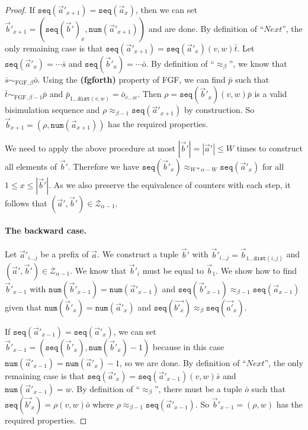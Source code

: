 \documentclass[draft]{scrartcl}
\theoremstyle{definition}
\newcommand{\seq}[1]{\mathtt{seq}({#1})}
\newcommand{\num}[1]{\mathtt{num}({#1})}
\newcommand{\dist}[2]{\mathtt{dist}({#1},{#2})}
\newcommand{\sij}{_{i\ldots{}j}}
\begin{document}
\begin{proof}
  If $\seq{\overrightarrow{a}'_{x+1}} = \seq{\overrightarrow{a}_{x}}$, then we can set $\overrightarrow{b}'_{x+1} = (\seq{\overrightarrow{b}'}_{x}, \num{\overrightarrow{a}'_{x+1}})$ and are done.
  By definition of ``$\mathit{Next}$'', the only remaining case is that $\seq{\overrightarrow{a}'_{x+1}} = \seq{\overrightarrow{a}'_{x}} (v, w) \bar{t}$.
  Let $\seq{\overrightarrow{a}'_{x}} = \cdots{}\bar{s}$ and $\seq{\overrightarrow{b}'_{x}} = \cdots{}\bar{o}$.
  By definition of ``$\approx_{\beta}$'', we know that $\bar{s} \sim_{\mathrm{FGF},\beta} \bar{o}$.
  Using the \textbf{(fgforth)} property of FGF, we can find $\bar{p}$ such that $\bar{t} \sim_{\mathrm{FGF},\beta-1} \bar{p}$ and $\bar{p}_{1\ldots{}\dist{v}{w}} = \bar{o}_{v\ldots{}w}$.
  Then $\rho = \seq{\overrightarrow{b}'_{x}} (v,w) \bar{p}$ is a valid bisimulation sequence and $\rho \approx_{\beta-1} \seq{\overrightarrow{a}'_{x+1}}$ by construction.
  So $\overrightarrow{b}_{x+1} = (\rho, \num{\overrightarrow{a}_{x+1}})$ has the required properties.

  We need to apply the above procedure at most $|\overrightarrow{b}'| = |\overrightarrow{a}'| \le W$ times to construct all elements of $\overrightarrow{b}'$.
  Therefore we have $\seq{\overrightarrow{b}'_{x}} \approx_{W*\alpha-W} \seq{\overrightarrow{a}'_{x}}$ for all $1 \le x \le |\overrightarrow{b}'|$.
  As we also preserve the equivalence of counters with each step, it follows that $(\overrightarrow{a}', \overrightarrow{b}') \in \mathcal{Z}_{\alpha-1}$.

  \paragraph{The backward case.}
  Let $\overrightarrow{a}'\sij$ be a prefix of $\overrightarrow{a}$.
  We construct a tuple $\overrightarrow{b}'$ with $\overrightarrow{b}'\sij = \overrightarrow{b}_{1\ldots{}\dist{i}{j}}$ and $(\overrightarrow{a}', \overrightarrow{b}') \in \mathcal{Z}_{\alpha-1}$.
  We know that $\overrightarrow{b}'_{i}$ must be equal to $\overrightarrow{b}_{1}$.
  We show how to find $\overrightarrow{b}'_{x-1}$ with $\num{\overrightarrow{b}'_{x-1}} = \num{\overrightarrow{a}'_{x-1}}$ and $\seq{\overrightarrow{b}'_{x-1}} \approx_{\beta-1} \seq{\overrightarrow{a}_{x-1}}$ given that $\num{\overrightarrow{b}'_{x}} = \num{\overrightarrow{a}'_{x}}$ and $\seq{\overrightarrow{b'_{x}}} \approx_{\beta} \seq{\overrightarrow{a'}_{x}}$.

  If $\seq{\overrightarrow{a}'_{x-1}} = \seq{\overrightarrow{a}'_{x}}$, we can set $\overrightarrow{b}'_{x-1} = (\seq{\overrightarrow{b}'_{x}}, \num{\overrightarrow{b}'_{x}} - 1)$ because in this case $\num{\overrightarrow{a}'_{x-1}} = \num{\overrightarrow{a}'_{x}} - 1$, so we are done.
  By definition of ``$\mathit{Next}$'', the only remaining case is that $\seq{\overrightarrow{a}'_{x}} = \seq{\overrightarrow{a}'_{x-1}} (v,w) \bar{s}$ and $\num{\overrightarrow{a}'_{x-1}} = w$.
  By definition of ``$\approx_{\beta}$'', there must be a tuple $\bar{o}$ such that $\seq{\overrightarrow{b'}_{x}} = \rho (v,w) \bar{o}$ where $\rho \approx_{\beta-1} \seq{\overrightarrow{a}'_{x-1}}$.
  So $\overrightarrow{b}'_{x-1} = (\rho, w)$ has the required properties.


\end{proof}
\end{document}
